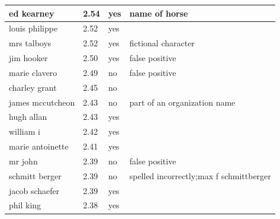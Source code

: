 \documentclass[10pt,journal,compsoc]{IEEEtran}
\begin{document}
\begin{table}
\begin{tabular}{|l|l|p{3cm}|p{3cm}|}
ed kearney       & 2.54 & yes                & name of horse                        \\ \hline
louis philippe   & 2.52 & yes                &                                      \\ \hline
mrs talboys      & 2.52 & yes                & fictional character                  \\ \hline
jim hooker       & 2.50 & yes                & false positive                       \\ \hline
marie clavero    & 2.49 & no                 & false positive                       \\ \hline
charley grant    & 2.45 & no                 &                     \\ \hline
james mccutcheon & 2.43 & no                 & part of an organization name                      \\ \hline
hugh allan       & 2.43   & yes                &                                      \\ \hline
william i        & 2.42   & yes                &                                      \\ \hline
marie antoinette & 2.41  & yes                &                                      \\ \hline
mr john      & 2.39 & no              & false positive                       \\ \hline
schmitt berger   & 2.39 & no                 & spelled incorrectly;max f schmittberger                       \\ \hline
jacob schaefer   & 2.39 & yes                &                                      \\ \hline
phil king	&	2.38	& yes	& 				\\ \hline
             
\end{tabular}

\end{table}
\end{document}
